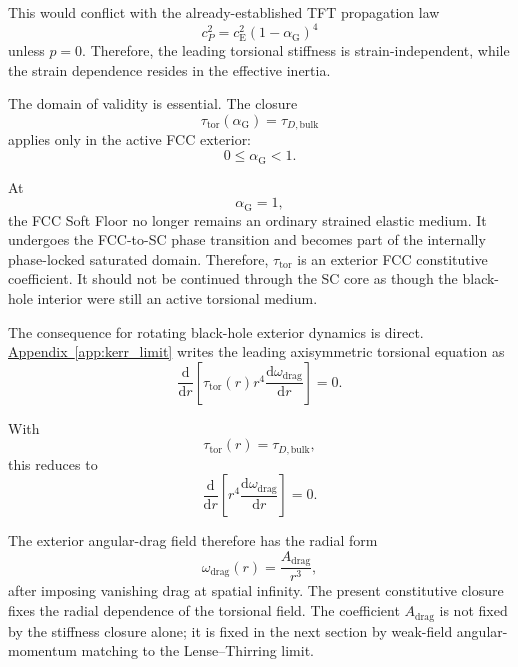 This would conflict with the already-established TFT propagation law
\begin{equation}
    c_P^2 = c_{\mathrm{E}}^2(1-\alpha_{\mathrm{G}})^4
\end{equation}
unless $p=0$. Therefore, the leading torsional stiffness is strain-independent, while the strain dependence resides in the effective inertia.

The domain of validity is essential. The closure
\begin{equation}
    \tau_{\mathrm{tor}}(\alpha_{\mathrm{G}}) = \tau_{D,\mathrm{bulk}}
\end{equation}
applies only in the active FCC exterior:
\begin{equation}
    0 \leq \alpha_{\mathrm{G}} < 1.
\end{equation}

At
\begin{equation}
    \alpha_{\mathrm{G}} = 1,
\end{equation}
the FCC Soft Floor no longer remains an ordinary strained elastic medium. It undergoes the FCC-to-SC phase transition and becomes part of the internally phase-locked saturated domain. Therefore, $\tau_{\mathrm{tor}}$ is an exterior FCC constitutive coefficient. It should not be continued through the SC core as though the black-hole interior were still an active torsional medium.

The consequence for rotating black-hole exterior dynamics is direct. \hyperref[app:kerr_limit]{Appendix~\ref*{app:kerr_limit}} writes the leading axisymmetric torsional equation as
\begin{equation}
    \frac{\mathrm{d}}{\mathrm{d}r} \left[ \tau_{\mathrm{tor}}(r) r^4 \frac{\mathrm{d}\omega_{\mathrm{drag}}}{\mathrm{d}r} \right] = 0.
\end{equation}

With
\begin{equation}
    \tau_{\mathrm{tor}}(r) = \tau_{D,\mathrm{bulk}},
\end{equation}
this reduces to
\begin{equation}
    \boxed{ \frac{\mathrm{d}}{\mathrm{d}r} \left[ r^4 \frac{\mathrm{d}\omega_{\mathrm{drag}}}{\mathrm{d}r} \right] = 0. }
\end{equation}

The exterior angular-drag field therefore has the radial form
\begin{equation}
    \omega_{\mathrm{drag}}(r) = \frac{A_{\mathrm{drag}}}{r^3},
\end{equation}
after imposing vanishing drag at spatial infinity. The present constitutive closure fixes the radial dependence of the torsional field. The coefficient $A_{\mathrm{drag}}$ is not fixed by the stiffness closure alone; it is fixed in the next section by weak-field angular-momentum matching to the Lense--Thirring limit.

